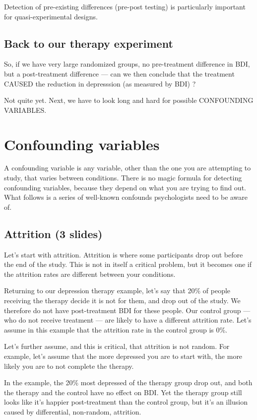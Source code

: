\documentclass[12pt]{article}
\begin{document}
Detection of pre-existing differences (pre-post testing) is
particularly important for quasi-experimental designs.

\subsection{Back to our therapy experiment}

So, if we have very large randomized groups, no pre-treatment
difference in BDI, but a post-treatment difference --- can we then
conclude that the treatment CAUSED the reduction in depresssion (as
measured by BDI) ?

Not quite yet. Next, we have to look long and hard for possible
CONFOUNDING VARIABLES.

\section{Confounding variables}

A confounding variable is any variable, other than the one you are
attempting to study, that varies between conditions. There is no magic
formula for detecting confounding variables, because they depend on
what you are trying to find out. What follows is a series of
well-known confounds psychologists need to be aware of.

\subsection{Attrition (3 slides)}

Let's start with attrition. Attrition is where some participants drop
out before the end of the study. This is not in itself a critical
problem, but it becomes one if the attrition rates are different
between your conditions.

Returning to our depression therapy example, let's say that 20\% of
people receiving the therapy decide it is not for them, and drop out
of the study. We therefore do not have post-treatment BDI for these
people. Our control group --- who do not receive treatment --- are
likely to have a different attrition rate. Let's assume in this
example that the attrition rate in the control group is 0\%.

Let's further assume, and this is critical, that attrition is not
random. For example, let's assume that the more depressed you are to
start with, the more likely you are to not complete the therapy.

In the example, the 20\% most depressed of the therapy group drop out,
and both the therapy and the control have no effect on BDI. Yet the
therapy group still looks like it's happier post-treatment than the
control group, but it's an illusion caused by differential,
non-random, attrition.
\end{document}
